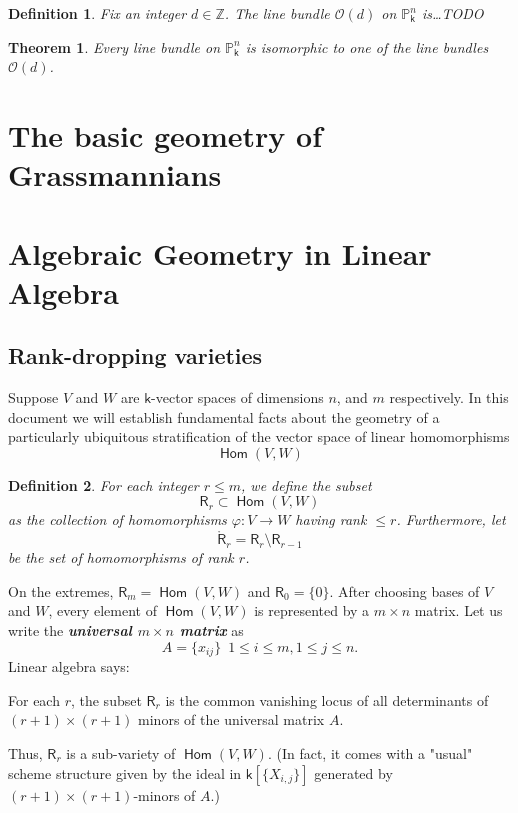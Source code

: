 \documentclass[11pt]{article}
\renewcommand{\P}{\mathbb{P}}
\renewcommand{\O}{\mathcal{O}}
\renewcommand{\Z}{\mathbb{Z}}
\renewcommand{\k}{\mathsf{k}}
\renewcommand{\to}{\longrightarrow}
\DeclareMathOperator{\Hom}{\mathsf{Hom}}
\renewcommand{\k}{\mathsf{k}}
\renewcommand{\P}{\mathbb P}
\renewcommand{\to}{{\longrightarrow}}
\newtheorem{theorem}{Theorem}[section]
\newtheorem{definition}{Definition}[section]
\begin{document}
\begin{definition}
Fix an integer \(d \in \Z\). The line bundle \(\O(d)\) on \(\P^{n}_{\k}\) is\ldots{}TODO 
\end{definition}

\begin{theorem}
Every line bundle on \(\P^n_{\k}\) is isomorphic to one of the line bundles \(\O(d)\).
\end{theorem}
\section{The basic geometry of Grassmannians}
\label{sec:orge121edf}
\section{Algebraic Geometry in Linear Algebra}
\label{sec:org84d8ea5}
\subsection{Rank-dropping varieties}
\label{sec:orgcf80b93}

Suppose \(V\) and \(W\) are \(\k\)-vector spaces of dimensions \(n\), and \(m\) respectively.  In this document we will establish fundamental facts about the geometry of a particularly ubiquitous stratification of the vector space of linear homomorphisms \[\Hom(V,W)\]


\begin{definition}
For each integer \(r \leq m\), we define the subset $$\mathsf{R}_{r} \subset \Hom(V,W)$$ as the collection of homomorphisms \(\varphi: V \to W\) having rank \(\leq r\).  Furthermore, let $$\mathring{\mathsf{R}}_{r} = \mathsf{R}_{r}\setminus \mathsf{R}_{r-1}$$ be the set of homomorphisms of rank \(r\).
\end{definition}


On the extremes, \(\mathsf{R}_m = \Hom(V,W)\) and \(\mathsf{R}_{0} = \{0\}\).  After choosing bases of \(V\) and \(W\), every element of \(\Hom(V,W)\) is represented by a \(m \times n\) matrix. Let us write the \textbf{\emph{universal \(m \times n\) matrix}} as 
\[A = \big\{ x_{ij} \big\} \,\,\,  1 \leq i \leq m, 1 \leq j \leq n.\]
Linear algebra says: 

For each \(r\), the subset \(\mathsf{R}_{r}\) is the common vanishing locus of all determinants of \((r+1) \times (r+1)\) minors of the universal matrix \(A\).

Thus, \(\mathsf{R}_{r}\) is a sub-variety of \(\Hom(V,W)\).  (In fact, it comes with a "usual" scheme structure given by the ideal in \(\k\left[\{X_{i,j}\}\right]\) generated by \((r+1) \times (r+1)\)-minors of \(A\).) 
\end{document}
